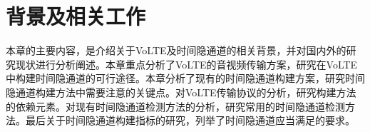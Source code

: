 \chapter{背景及相关工作}
\label{chap:backinfo}

本章的主要内容，是介绍关于VoLTE及时间隐通道的相关背景，并对国内外的研究现状进行分析阐述。本章重点分析了VoLTE的音视频传输方案，研究在VoLTE中构建时间隐通道的可行途径。本章分析了现有的时间隐通道构建方案，研究时间隐通道构建方法中需要注意的关键点。对VoLTE传输协议的分析，研究构建方法的依赖元素。对现有时间隐通道检测方法的分析，研究常用的时间隐通道检测方法。最后关于时间隐通道构建指标的研究，列举了时间隐通道应当满足的要求。


